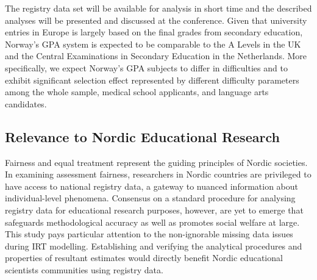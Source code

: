 The registry data set will be available for analysis in short time and the described analyses will be presented and discussed at the conference. Given that university entries in Europe is largely based on the final grades from secondary education, Norway's GPA system is expected to be comparable to the A Levels in the UK and the Central Examinations in Secondary Education in the Netherlands. More specifically, we expect Norway's GPA subjects to differ in difficulties \parencite[per report by][]{he:2018} and to exhibit significant selection effect \parencite[as demonstrated in][]{korobko:2008} represented by different difficulty parameters among the whole sample, medical school applicants, and language arts candidates.

\subsection{Relevance to Nordic Educational Research}

Fairness and equal treatment represent the guiding principles of Nordic societies. In examining assessment fairness, researchers in Nordic countries are privileged to have access to national registry data, a gateway to nuanced information about individual-level phenomena. Consensus on a standard procedure for analysing registry data for educational research purposes, however, are yet to emerge that safeguards methodological accuracy as well as promotes social welfare at large. This study pays particular attention to the non-ignorable missing data issues during IRT modelling. Establishing and verifying the analytical procedures and properties of resultant estimates would directly benefit Nordic educational scientists communities using registry data.

\printbibliography